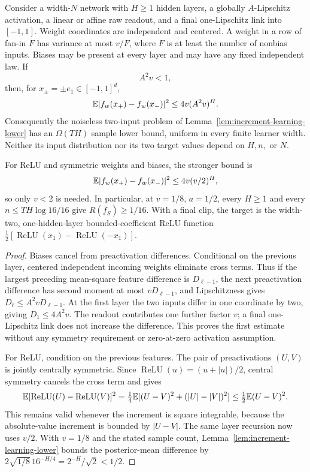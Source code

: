 \begin{proposition}
\label{prop:linear-depth-lower}
Consider a width-$N$ network with $H\ge1$ hidden layers, a globally $A$-Lipschitz activation, a linear or affine raw readout, and a final one-Lipschitz link into $[-1,1]$. Weight coordinates are independent and centered. A weight in a row of fan-in $F$ has variance at most $v/F$, where $F$ is at least the number of nonbias inputs. Biases may be present at every layer and may have any fixed independent law. If
\[
 A^2v<1,
\]
then, for $x_\pm=\pm e_1\in[-1,1]^d$,
\[
 \mathbb E|f_w(x_+)-f_w(x_-)|^2\le4v(A^2v)^H.
\]
Consequently the noiseless two-input problem of Lemma~\ref{lem:increment-learning-lower} has an $\Omega(TH)$ sample lower bound, uniform in every finite learner width. Neither its input distribution nor its two target values depend on $H,n,$ or $N$.

For ReLU and symmetric weights and biases, the stronger bound is
\[
 \mathbb E|f_w(x_+)-f_w(x_-)|^2\le4v(v/2)^H,
\]
so only $v<2$ is needed. In particular, at $v=1/8$, $a=1/2$, every $H\ge1$ and every
$n\le TH\log16/16$ give $R(\bar f_S)\ge1/16$.
With a final clip, the target is the width-two, one-hidden-layer bounded-coefficient ReLU function
$\tfrac12[\operatorname{ReLU}(x_1)-\operatorname{ReLU}(-x_1)]$.
\end{proposition}
\begin{proof}
Biases cancel from preactivation differences. Conditional on the previous layer, centered independent incoming weights eliminate cross terms. Thus if the largest preceding mean-square feature difference is $D_{\ell-1}$, the next preactivation difference has second moment at most $vD_{\ell-1}$, and Lipschitzness gives
$D_\ell\le A^2vD_{\ell-1}$.
At the first layer the two inputs differ in one coordinate by two, giving $D_1\le4A^2v$. The readout contributes one further factor $v$; a final one-Lipschitz link does not increase the difference. This proves the first estimate without any symmetry requirement or zero-at-zero activation assumption.

For ReLU, condition on the previous features. The pair of preactivations $(U,V)$ is jointly centrally symmetric. Since
$\operatorname{ReLU}(u)=(u+|u|)/2$, central symmetry cancels the cross term and gives
\[
 \mathbb E[\operatorname{ReLU}(U)-\operatorname{ReLU}(V)]^2
 =\tfrac14\mathbb E[(U-V)^2+(|U|-|V|)^2]
 \le\tfrac12\mathbb E(U-V)^2.
\]
This remains valid whenever the increment is square integrable, because the absolute-value increment is bounded by $|U-V|$. The same layer recursion now uses $v/2$. With $v=1/8$ and the stated sample count, Lemma~\ref{lem:increment-learning-lower} bounds the posterior-mean difference by
$2\sqrt{1/8}\,16^{-H/4}=2^{-H}/\sqrt2<1/2$.
\end{proof}


